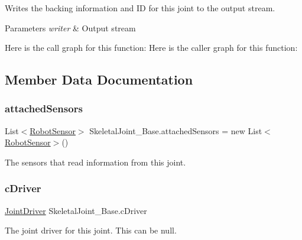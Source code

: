 Writes the backing information and ID for this joint to the output stream. 


\begin{DoxyParams}{Parameters}
{\em writer} & Output stream\\
\hline
\end{DoxyParams}
Here is the call graph for this function\+:
Here is the caller graph for this function\+:


\subsection{Member Data Documentation}
\mbox{\label{class_skeletal_joint___base_aaeb09af11a9640ec8d144f825f56c81a}} 
\subsubsection{\texorpdfstring{attached\+Sensors}{attachedSensors}}
{\footnotesize\ttfamily List$<$\hyperlink{class_robot_sensor}{Robot\+Sensor}$>$ Skeletal\+Joint\+\_\+\+Base.\+attached\+Sensors = new List$<$\hyperlink{class_robot_sensor}{Robot\+Sensor}$>$()}



The sensors that read information from this joint. 

\mbox{\label{class_skeletal_joint___base_a69a85fe8ff6cee4d5773884798300fcf}} 
\subsubsection{\texorpdfstring{c\+Driver}{cDriver}}
{\footnotesize\ttfamily \hyperlink{class_joint_driver}{Joint\+Driver} Skeletal\+Joint\+\_\+\+Base.\+c\+Driver}



The joint driver for this joint. This can be null. 

\mbox{\label{class_skeletal_joint___base_a590ba897b9331ad634a26101e27d18ed}} 
